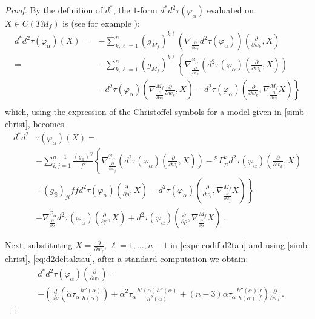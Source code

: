 \documentclass[11pt]{amsart}
\theoremstyle{plain}
\theoremstyle{definition}
\numberwithin{equation}{section}
\numberwithin{equation}{section}
\begin{document}
\begin{proof}
By the definition of $d^*$, the $1$-form $d^*d^2 \tau(\varphi_\alpha)$ evaluated on $X \in C(TM_f)$ is (see for example \cite[pag. 8]{EL83}):
\begin{align*}
d^*d^2 \tau(\varphi_\alpha)(X)  = &- \sum_{k,\ell =1}^n (g_{M_f})^{k \ell} \left(\nabla_{\frac{\partial}{\partial w_\ell }} d^2 \tau(\varphi_\alpha)\right)\left( \frac{\partial}{\partial w_k}, X\right)\\
= & - \sum_{k,\ell =1}^n (g_{M_f})^{k\ell } \left\{\nabla^{\varphi_{\alpha}}_{\frac{\partial}{\partial w_\ell }} \left(d^2 \tau(\varphi_\alpha)\left( \frac{\partial}{\partial w_k}, X\right) \right)\right.  \\
& \left.  - d^2 \tau(\varphi_\alpha)\left( \nabla^{M_f}_{\frac{\partial}{\partial w_\ell }}\frac{\partial}{\partial w_k}, X\right) -  d^2 \tau(\varphi_\alpha)\left( \frac{\partial}{\partial w_k}, \nabla^{M_f}_{\frac{\partial}{\partial w_\ell }}X\right) \right\} \\
\end{align*}
which, using the expression of the Christoffel symbols for a model given in \eqref{simb-christ}, becomes
\begin{align}\label{expr-codif-d2tau}
d^*d^2& \tau(\varphi_\alpha)(X)  =\nonumber\\
 &- \sum_{i,j=1}^{n-1 }\frac{(g_\mathbb{S})^{ij}}{f^2} \left\{\nabla^{\varphi_{\alpha}}_{\frac{\partial}{\partial w_j}} \left(d^2 \tau(\varphi_\alpha)\left(\frac{\partial}{\partial w_i}, X\right)\right) - {}^\mathbb{S}\Gamma_{ji}^k d^2 \tau(\varphi_\alpha)\left( \frac{\partial}{\partial w_k}, X \right) \right. \nonumber \\
& \left.  + (g_\mathbb{S})_{ji} f\dot{f}  d^2 \tau(\varphi_\alpha)\left( \frac{\partial}{\partial \rho}, X \right)  -  d^2 \tau(\varphi_\alpha)\left(\frac{\partial}{\partial w_i}, \nabla^{M_f}_{\frac{\partial}{\partial w_j}}X\right) \right\}\\
& -\nabla^{\varphi_{\alpha}}_{\frac{\partial}{\partial \rho}} d^2 \tau(\varphi_\alpha)\left(\frac{\partial}{\partial \rho}, X \right) +  d^2 \tau(\varphi_\alpha)\left(\frac{\partial}{\partial \rho}, \nabla^{M_f}_{\frac{\partial}{\partial \rho}}X\right)\,. \nonumber
\end{align}	

Next, substituting $X = \frac{\partial}{\partial w_\ell}$, $\ell=1, \dots, n-1$ in \eqref{expr-codif-d2tau} and using \eqref{simb-christ}, \eqref{eq:d2deltaktau}, after a standard computation we obtain: 
\begin{align*}
&d^*d^2 \tau(\varphi_\alpha)\left(\frac{\partial}{\partial w_\ell}\right) 	
= \\
&- \left( \frac{d}{d \rho}\left(\dot{\alpha} \tau_{\alpha} \frac{h''(\alpha)}{h(\alpha)}\right) +  \dot{\alpha}^2 \tau_{\alpha} \frac{h'(\alpha)h''(\alpha)}{h^2(\alpha)} + (n-3) \dot{\alpha} \tau_{\alpha} \frac{h''(\alpha)}{h(\alpha)}\frac{\dot{f}}{f} \right)\frac{\partial}{\partial w_\ell}  \,.
\end{align*}	


\end{proof}
\end{document}
